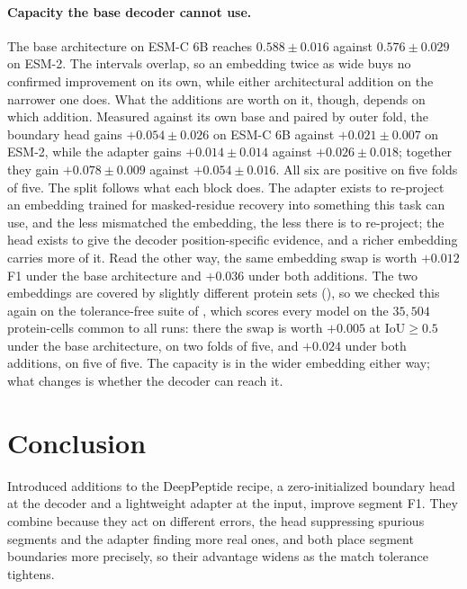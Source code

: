 \documentclass{article}
\begin{document}
\paragraph{Capacity the base decoder cannot use.} The base architecture on ESM-C 6B reaches $0.588\pm0.016$ against $0.576\pm0.029$ on ESM-2. The intervals overlap, so an embedding twice as wide buys no confirmed improvement on its own, while either architectural addition on the narrower one does. What the additions are worth on it, though, depends on which addition. Measured against its own base and paired by outer fold, the boundary head gains $+0.054\pm0.026$ on ESM-C 6B against $+0.021\pm0.007$ on ESM-2, while the adapter gains $+0.014\pm0.014$ against $+0.026\pm0.018$; together they gain $+0.078\pm0.009$ against $+0.054\pm0.016$. All six are positive on five folds of five. The split follows what each block does. The adapter exists to re-project an embedding trained for masked-residue recovery into something this task can use, and the less mismatched the embedding, the less there is to re-project; the head exists to give the decoder position-specific evidence, and a richer embedding carries more of it. Read the other way, the same embedding swap is worth $+0.012$ F1 under the base architecture and $+0.036$ under both additions. The two embeddings are covered by slightly different protein sets (), so we checked this again on the tolerance-free suite of , which scores every model on the $35{,}504$ protein-cells common to all runs: there the swap is worth $+0.005$ at $\mathrm{IoU}\ge0.5$ under the base architecture, on two folds of five, and $+0.024$ under both additions, on five of five. The capacity is in the wider embedding either way; what changes is whether the decoder can reach it.

\section{Conclusion}
\label{sec:conclusion}

Introduced additions to the DeepPeptide recipe, a zero-initialized boundary head at the decoder and a lightweight adapter at the input, improve segment F1. 
They combine because they act on different errors, the head suppressing spurious segments and the adapter finding more real ones, and both place segment boundaries more precisely, so their advantage widens as the match tolerance tightens.
\end{document}
